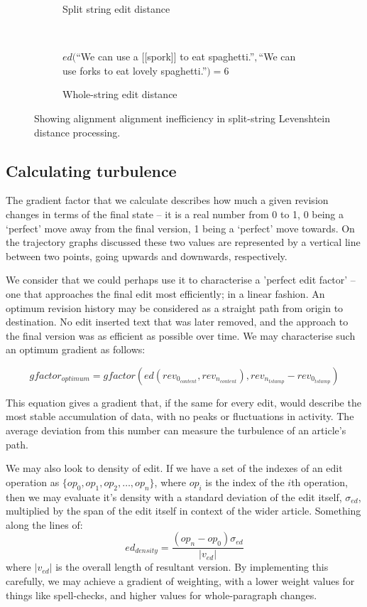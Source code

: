 \begin{figure}[p]
\begin{subfigure}[t]{\linewidth}
\begin{tikzpicture}
    \end{tikzpicture}
    \caption{Split string edit distance}
  \end{subfigure}\\
  \vspace{30mm}
  \begin{subfigure}[t]{\linewidth}
    $ed($``We can use a [[spork]] to eat spaghetti.''$,$``We can use forks
    to eat lovely spaghetti.''$) = 6$
    \caption{Whole-string edit distance}
  \end{subfigure}
  \caption{Showing alignment alignment inefficiency in split-string
    Levenshtein distance processing.}
\label{fig:split-string-problem}
\end{figure}

\subsection*{Calculating turbulence}
The gradient factor that we calculate describes how much a given
revision changes in terms of the final state -- it is a real number
from 0 to 1, 0 being a `perfect' move away from the final version, 1
being a `perfect' move towards. On the trajectory graphs discussed
these two values are represented by a vertical line between two
points, going upwards and downwards, respectively.

We consider that we could perhaps use it to characterise a 'perfect
edit factor' -- one that approaches the final edit most efficiently; in a
linear fashion. An optimum revision history may be considered as a
straight path from origin to destination. No edit inserted text that
was later removed, and the approach to the final version was as
efficient as possible over time. We may characterise such an optimum
gradient as follows:

\[
  gfactor_{optimum} = gfactor(ed(rev_{0_{content}},
  rev_{n_{content}}), rev_{n_{tstamp}} - rev_{0_{tstamp}})
\]

This equation gives a gradient that, if the same for every edit, would
describe the most stable accumulation of data, with no peaks or
fluctuations in activity. The average deviation from this number can
measure the turbulence of an article's path. 

We may also look to density of edit. If we have a set of the indexes
of an edit operation as $\{op_0,op_1,op_2,\dots, op_n\}$, where $op_i$
is the index of the $i$th operation, then we may evaluate it's density
with a standard deviation of the edit itself, $\sigma_{ed}$,
multiplied by the span of the edit itself in context of the wider
article. Something along the lines of:
$$ed_{density} = \frac{(op_n - op_0)\sigma_{ed}}{|v_{ed}|}$$ where
$|v_{ed}|$ is the overall length of resultant version. By implementing
this carefully, we may achieve a gradient of weighting, with a lower
weight values for things like spell-checks, and higher values for
whole-paragraph changes.

